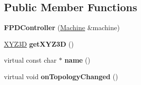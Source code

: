 \subsection*{Public Member Functions}
\begin{DoxyCompactItemize}
\item 
\hypertarget{classfirestep_1_1_f_p_d_controller_a454af68839decada4629fd40454bf1dc}{{\bfseries F\+P\+D\+Controller} (\hyperlink{classfirestep_1_1_machine}{Machine} \&machine)}\label{classfirestep_1_1_f_p_d_controller_a454af68839decada4629fd40454bf1dc}

\item 
\hypertarget{classfirestep_1_1_f_p_d_controller_acb0505b40ced4c9d25ffc54ed119ec83}{\hyperlink{classfirestep_1_1_x_y_z3_d}{X\+Y\+Z3\+D} {\bfseries get\+X\+Y\+Z3\+D} ()}\label{classfirestep_1_1_f_p_d_controller_acb0505b40ced4c9d25ffc54ed119ec83}

\item 
\hypertarget{classfirestep_1_1_f_p_d_controller_a33cdaa55e8e64a44b05aaf54d506f66f}{virtual const char $\ast$ {\bfseries name} ()}\label{classfirestep_1_1_f_p_d_controller_a33cdaa55e8e64a44b05aaf54d506f66f}

\item 
\hypertarget{classfirestep_1_1_f_p_d_controller_aed5b4cee634eadd56ce6b05a322fa97e}{virtual void {\bfseries on\+Topology\+Changed} ()}\label{classfirestep_1_1_f_p_d_controller_aed5b4cee634eadd56ce6b05a322fa97e}

\end{DoxyCompactItemize}
